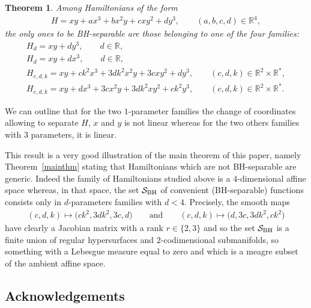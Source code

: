 \documentclass[pdftex]{sigma}%
\numberwithin{equation}{section}
\newtheorem{Theorem}{Theorem}[section]
\begin{document}
\begin{Theorem}
	Among Hamiltonians of the form
\begin{gather*}
H=xy+ax^3+bx^2y+cxy^2+dy^3,\qquad (a,b,c,d)\in\mathbb{R}^4,
\end{gather*}
	the only ones to be BH-separable are those belonging to one of the four families:
\begin{gather*}	
H_d=xy+dy^3,\qquad d\in\mathbb{R},
\\	
H_d=xy+dx^3,\qquad d\in\mathbb{R},
\\	
H_{c,d,k}=xy+ck^2x^3+3dk^2x^2y+3cxy^2+dy^3,\qquad (c,d,k)\in\mathbb{R}^2\times\mathbb{R}^*,
\\	
H_{c,d,k}=xy+dx^3+3cx^2y+3dk^2xy^2+ck^2y^3,\qquad (c,d,k)\in\mathbb{R}^2\times\mathbb{R}^*.	
\end{gather*}
\end{Theorem}

\begin{Remark}
	We can outline that for the two $1$-parameter families the change of coordinates allowing to separate $H$, $x$ and $y$ is not linear whereas for the two others families with $3$ parameters, it is linear.
\end{Remark}

\begin{Remark}
	This result is a very good illustration of the main theorem of this paper, namely Theorem~\ref{mainthm} stating that Hamiltonians which are not BH-separable are generic. Indeed the family of Hamiltonians studied above is a $4$-dimensional affine space whereas, in that space, the set ${\cal S}_{\rm BH}$ of convenient (BH-separable) functions consists only in $d$-parameters families with $d<4$. Precisely, the smooth maps
\begin{gather*}
(c,d,k)\mapsto\big(ck^2,3dk^2,3c,d\big)\qquad \text{and}\qquad (c,d,k)\mapsto\big(d, 3c,3dk^2,ck^2\big)
\end{gather*}
	have clearly a Jacobian matrix with a rank $r\in\{2,3\}$ and so the set ${\cal S}_{\rm BH}$ is a finite union of regular hypersurfaces and $2$-codimensional submanifolds, so something with a Lebesgue measure equal to zero and which is a meagre subset of the ambient affine space.
	
\end{Remark}

\subsection*{Acknowledgements}
\end{document}
